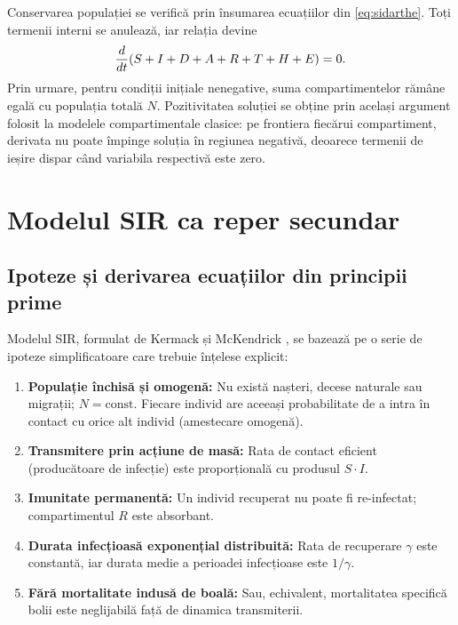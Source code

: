 Conservarea populației se verifică prin însumarea ecuațiilor din
\eqref{eq:sidarthe}. Toți termenii interni se anulează, iar relația devine
\begin{equation}
\frac{d}{dt}(S+I+D+A+R+T+H+E)=0.
\end{equation}
Prin urmare, pentru condiții inițiale nenegative, suma compartimentelor rămâne
egală cu populația totală $N$. Pozitivitatea soluției se
obține prin același argument folosit la modelele compartimentale clasice: pe
frontiera fiecărui compartiment, derivata nu poate împinge soluția în regiunea
negativă, deoarece termenii de ieșire dispar când variabila respectivă este zero.

\section{Modelul SIR ca reper secundar}
\label{sec:model_sir}

\subsection{Ipoteze și derivarea ecuațiilor din principii prime}
\label{subsec:sir_derivare}

Modelul SIR, formulat de Kermack și McKendrick \cite{kermack1927}, se bazează
pe o serie de ipoteze simplificatoare care trebuie înțelese explicit:

\begin{enumerate}
    \item \textbf{Populație închisă și omogenă:} Nu există nașteri, decese
    naturale sau migrații; $N = \text{const}$. Fiecare individ are aceeași
    probabilitate de a intra în contact cu orice alt individ (amestecare omogenă).
    \item \textbf{Transmitere prin acțiune de masă:} Rata de contact eficient
    (producătoare de infecție) este proporțională cu produsul $S \cdot I$.
    \item \textbf{Imunitate permanentă:} Un individ recuperat nu poate fi
    re-infectat; compartimentul $R$ este absorbant.
    \item \textbf{Durata infecțioasă exponențial distribuită:} Rata de recuperare
    $\gamma$ este constantă, iar durata medie a perioadei infecțioase este $1/\gamma$.
    \item \textbf{Fără mortalitate indusă de boală:} Sau, echivalent, mortalitatea
    specifică bolii este neglijabilă față de dinamica transmiterii.
\end{enumerate}

